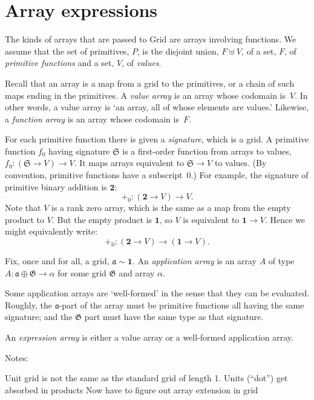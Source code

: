 \documentclass[11pt]{article}
\newcommand{\gr}[1]{\mathfrak{#1}}
\begin{document}
\section{Array expressions}

The kinds of arrays that are passed to Grid are arrays involving functions. We
assume that the set of primitives, $P$, is the disjoint union, $F \uplus V$, of a
set, $F$, of \emph{primitive functions} and a set, $V$, of \emph{values}.

Recall that an array is a map from a grid to the primitives, or a chain of such
maps ending in the primitives. A \emph{value array} is an array whose codomain
is~$V$. In other words, a value array is `an array, all of whose elements are
values.' Likewise, a \emph{function array} is an array whose codomain is~$F$.

For each primitive function there is given a \emph{signature}, which is a
grid. A primitive function $f_0$ having signature $\gr{S}$ is a first-order
function from arrays to values, $f_0: (\gr{S} \to V) \to V$. It maps arrays
equivalent to $\gr{S}\to V$ to values. (By convention, primitive functions have a
subscript~0.) For example, the signature of primitive binary addition is
$\mathbf{2}$:
\begin{equation*}
+_0: (\mathbf{2} \to V) \to V.
\end{equation*}
Note that $V$ is a rank zero array, which is the same as a map from the empty
product to $V$. But the empty product is $\mathbf{1}$, so $V$ is equivalent to
$\mathbf{1}\to V$. Hence we might equivalently write:
\begin{equation*}
+_0: (\mathbf{2} \to V) \to (\mathbf{1} \to V).
\end{equation*}

Fix, once and for all, a grid, $\gr{a} \sim \mathbf{1}$. An \emph{application
array} is an array $A$ of type $A: \gr{a}\oplus\gr{G} \to \alpha$ for some grid
$\gr{G}$ and array $\alpha$. 

Some application arrays are `well-formed' in the sense that they can be
evaluated. Roughly, the $\gr{a}$-part of the array must be primitive
functions all having the same signature; and the $\gr{G}$ part must have the
same type as that signature.

An \emph{expression array} is either a value array or a well-formed application
array.

Notes:

Unit grid is not the same as the standard grid of length 1.
Units (``dot'') get absorbed in products
Now have to figure out array extension in grid
\end{document}

